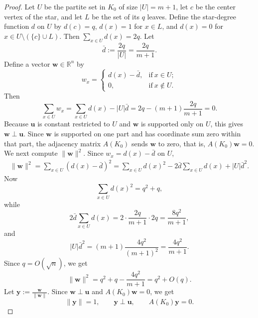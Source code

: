 \documentclass[11pt,a4paper]{article}
\theoremstyle{definition}
\theoremstyle{plain}
\begin{document}
\begin{proof}
Let $U$ be the partite set in $K_0$ of size $|U|=m+1$,
let $c$ be the center vertex of the star, and let $L$ be the set of its $q$ leaves. 
Define the star-degree function $d$ on $U$ by $ d(c)=q$, $ d(x)=1 $ for $x\in L$, 
and $d(x)=0$ for $x\in U\setminus(\{c\}\cup L)$.  
Then $   \sum_{x\in U}d(x)=2q$. 
Let
\[
        \bar d:=\frac{2q}{|U|}=\frac{2q}{m+1}.
\]
Define a vector $\bm{w} \in \mathbb{R}^n$ by
\[
        w_x=\begin{cases}
             d(x)-\bar d, &\text{if}~ x\in U;\\
             0,           &\text{if}~ x\notin U.
             \end{cases}
\]
Then
\[
        \sum_{x\in U}w_x
        =\sum_{x\in U}d(x)-|U|\bar d
        =2q-(m+1)\frac{2q}{m+1}=0.
\]
Because $\bm{u}$ is constant restricted to $U$ and $\bm{w}$ is supported only on $U$, this gives $  \bm{w}\perp \bm{u}$. 
Since $\bm{w}$ is supported on one part and has coordinate sum zero within that part, the 
adjacency matrix $A(K_0)$ sends $\bm{w}$ to zero, that is,  $A(K_0)\bm{w}=0$.  
We next compute $\|\bm{w}\|^2$. Since $w_x=d(x)-\bar d$ on $U$,
\begin{align*}
        \|\bm{w}\|^2
        =\sum_{x\in U}(d(x)-\bar d)^2  
        =\sum_{x\in U}d(x)^2
          -2\bar d\sum_{x\in U}d(x)
          +|U|\bar d^2.
\end{align*}
Now
\[
        \sum_{x\in U}d(x)^2=q^2+q,
\]
while
\[
        2\bar d\sum_{x\in U}d(x)
        =2\cdot\frac{2q}{m+1}\cdot 2q
        =\frac{8q^2}{m+1},
\]
and
\[
        |U|\bar d^2
        =(m+1)\frac{4q^2}{(m+1)^2}
        =\frac{4q^2}{m+1}.
\]
Since $q=O(\sqrt n)$, we get 
\begin{equation}
        \|\bm{w}\|^2=q^2+q-\frac{4q^2}{m+1}=q^2+O(q).
        \label{eq:w-norm}
\end{equation} 
Let $ \bm{y}:=\frac{\bm{w}}{\| \bm{w}\|}$. 
Since $\bm{w}\perp \bm{u}$ and $A(K_0)\bm{w}=0$, we get 
\begin{equation}
        \|\bm{y}\|=1,
        \qquad
        \bm{y}\perp \bm{u},
        \qquad
        A(K_0) \bm{y} =0.
        \label{eq:y-properties}
\end{equation}


\end{proof}
\end{document}
